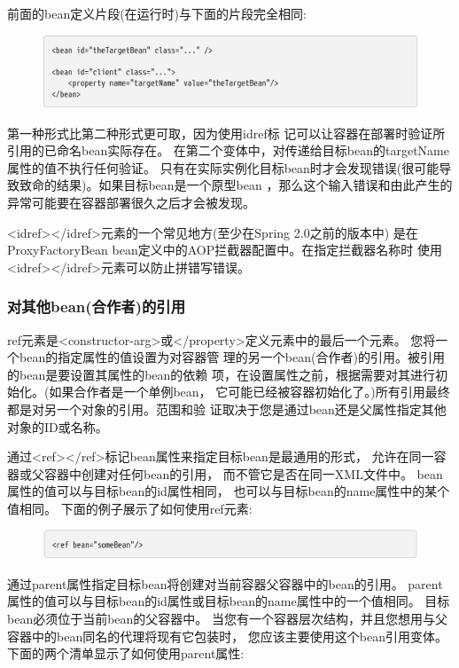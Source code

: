 前面的bean定义片段(在运行时)与下面的片段完全相同:

\begin{figure}[ht]
    \centering
    \includegraphics[width=1\linewidth]{./Figure/IMG_code_36.png}
\end{figure}

第一种形式比第二种形式更可取，因为使用idref标
记可以让容器在部署时验证所引用的已命名bean实际存在。
在第二个变体中，对传递给目标bean的targetName属性的值不执行任何验证。
只有在实际实例化目标bean时才会发现错误(很可能导致致命的结果)。如果目标bean是一个原型bean
，那么这个输入错误和由此产生的异常可能要在容器部署很久之后才会被发现。

<idref></idref>元素的一个常见地方(至少在Spring 2.0之前的版本中)
是在ProxyFactoryBean bean定义中的AOP拦截器配置中。在指定拦截器名称时
使用<idref></idref>元素可以防止拼错写错误。

\subsubsection{对其他bean(合作者)的引用}
ref元素是<constructor-arg>或</property>定义元素中的最后一个元素。
您将一个bean的指定属性的值设置为对容器管
理的另一个bean(合作者)的引用。被引用的bean是要设置其属性的bean的依赖
项，在设置属性之前，根据需要对其进行初始化。(如果合作者是一个单例bean，
它可能已经被容器初始化了。)所有引用最终都是对另一个对象的引用。范围和验
证取决于您是通过bean还是父属性指定其他对象的ID或名称。

通过<ref></ref>标记bean属性来指定目标bean是最通用的形式，
允许在同一容器或父容器中创建对任何bean的引用，
而不管它是否在同一XML文件中。
bean属性的值可以与目标bean的id属性相同，
也可以与目标bean的name属性中的某个值相同。
下面的例子展示了如何使用ref元素:

\begin{figure}[ht]
    \centering
    \includegraphics[width=1\linewidth]{./Figure/IMG_code_37.png}
\end{figure}

通过parent属性指定目标bean将创建对当前容器父容器中的bean的引用。
parent属性的值可以与目标bean的id属性或目标bean的name属性中的一个值相同。
目标bean必须位于当前bean的父容器中。
当您有一个容器层次结构，并且您想用与父容器中的bean同名的代理将现有它包装时，
您应该主要使用这个bean引用变体。下面的两个清单显示了如何使用parent属性:

